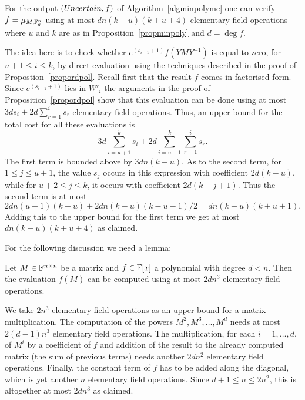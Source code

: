 \begin{Prop}\label{eval}
    \mbox{}\par
{}
    For the output $(\textsc{Uncertain},f)$ of Algorithm~\ref{algminpolymc} 
    one can verify $f = \mu_{M,\mathbb{F}_q^n}$ using
    at most $dn(k-u)(k+u+4)$ elementary field operations where $u$ and
    $k$ are as in Proposition~\ref{propminpoly} and $d = \deg f$.
\end{Prop}
\proofbeg
The idea here is to check whether $e^{(s_{i-1}+1)} f(YMY^{-1})$ is equal to zero, for 
$u+1 \le i \le k$,
by direct evaluation using the techniques described in
the proof of Propostion~\ref{propordpol}. Recall first that the
result $f$ comes in factorised form. Since $e^{(s_{i-1}+1)}$ lies
in $W'_i$ the arguments in the proof of Proposition~\ref{propordpol}
show that this evaluation can be done using at most
$3d s_i + 2d \sum_{r=1}^i s_r$ elementary field operations. Thus, an
upper bound for the total cost for all these evaluations is
\[ 3d \sum_{i=u+1}^k s_i + 2d \sum_{i=u+1}^k \sum_{r=1}^i s_r. \]
The first term is bounded above by $3dn(k-u)$. As to the second
term, for $1 \le j \le u+1$, the value $s_j$ occurs in this expression
with coefficient $2d(k-u)$, while for $u+2 \le j \le k$, it occurs
with coefficient $2d(k-j+1)$. Thus the second term is at most
\[ 
2dn(u+1)(k-u) + 2dn(k-u)(k-u-1)/2 = dn(k-u)(k+u+1). 
\]
Adding this to the upper bound for the first term we get at most
$dn(k-u)(k+u+4)$ as claimed.
\proofend

\medskip
For the following discussion we need a lemma:

\begin{Lemm}
\label{costpolyeval}
Let $M \in \mathbb{F}^{n \times n}$ be a matrix and $f \in \mathbb{F}[x]$ a polynomial 
with degree $d < n$. Then the evaluation $f(M)$ can be computed using
at most $2dn^3$ elementary field operations.
\end{Lemm}

\proofbeg We take $2n^3$ elementary field operations as an upper bound for a matrix
multiplication. The computation of the powers $M^2, M^3, \ldots, M^d$
needs at most $2(d-1)n^3$ elementary field operations. The
multiplication, for each $i=1,\dots,d$, of $M^i$ by a coefficient of $f$
and addition of the result to the already computed matrix (the sum of previous terms) 
needs another $2dn^2$ elementary field operations. Finally, the
constant term of $f$ has to be added along the diagonal, which is yet
another $n$ elementary field operations. Since $d+1\le n \le 2 n^2$, 
this is altogether at most $2dn^3$
as claimed.
\proofend

